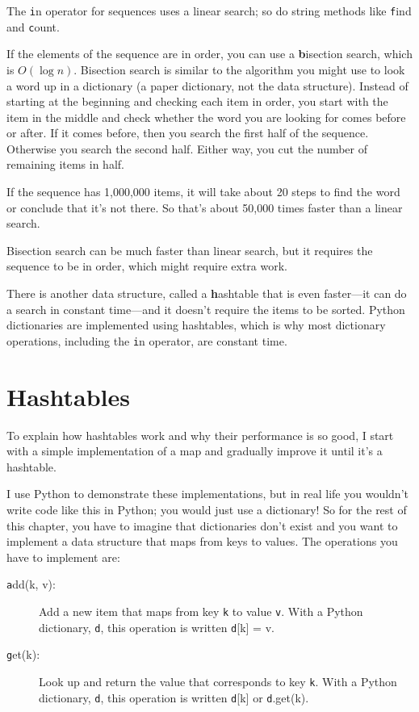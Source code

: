 \documentclass[
DIV=11,
fontsize=13,
twoside,
headinclude=false,
titlepage=firstiscover,
abstract=true,
headsepline=true,
footsepline=true,
chapterprefix=true, %
headings=big,
bibliography=totoc,%
captions=tableheading
]{scrbook}
\theoremstyle{definition}
\begin{document}
The {\texttt in} operator for sequences uses a linear search; so do string
methods like {\texttt find} and {\texttt count}.

If the elements of the sequence are in order, you can use a {\textbf
  bisection search}, which is $O(\log n)$.  Bisection search is
similar to the algorithm you might use to look a word up in a
dictionary (a paper dictionary, not the data structure).  Instead of
starting at the beginning and checking each item in order, you start
with the item in the middle and check whether the word you are looking
for comes before or after.  If it comes before, then you search the
first half of the sequence.  Otherwise you search the second half.
Either way, you cut the number of remaining items in half.

If the sequence has 1,000,000 items, it will take about 20 steps to
find the word or conclude that it's not there.  So that's about 50,000
times faster than a linear search.

Bisection search can be much faster than linear search, but
it requires the sequence to be in order, which might require
extra work.

There is another data structure, called a {\textbf hashtable} that
is even faster---it can do a search in constant time---and it
doesn't require the items to be sorted.  Python dictionaries
are implemented using hashtables, which is why most dictionary
operations, including the {\texttt in} operator, are constant time.


\section{Hashtables}
\label{hashtable}

To explain how hashtables work and why their performance is so
good, I start with a simple implementation of a map and
gradually improve it until it's a hashtable.

I use Python to demonstrate these implementations, but in real
life you wouldn't write code like this in Python; you would just use a
dictionary!  So for the rest of this chapter, you have to imagine that
dictionaries don't exist and you want to implement a data structure
that maps from keys to values.  The operations you have to
implement are:

\begin{description}

\item[{\texttt add(k, v)}:] Add a new item that maps from key {\texttt k}
to value {\texttt v}.  With a Python dictionary, {\texttt d}, this operation
is written {\texttt d[k] = v}.

\item[{\texttt get(k)}:] Look up and return the value that corresponds
to key {\texttt k}.  With a Python dictionary, {\texttt d}, this operation
is written {\texttt d[k]} or {\texttt d.get(k)}.

\end{description}
\end{document}
